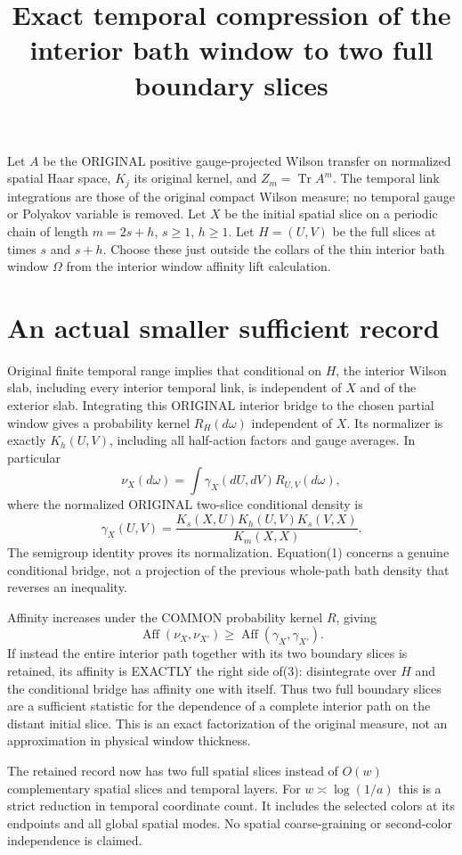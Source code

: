 \documentclass{article}
\title{Exact temporal compression of the interior bath window to two full boundary slices}\author{}\date{}
\begin{document}
\maketitle
Let $A$ be the ORIGINAL positive gauge-projected Wilson transfer on normalized spatial Haar space, $K_j$ its original kernel, and $Z_m=\operatorname{Tr}A^m$. The temporal link integrations are those of the original compact Wilson measure; no temporal gauge or Polyakov variable is removed. Let $X$ be the initial spatial slice on a periodic chain of length $m=2s+h$, $s\ge1$, $h\ge1$. Let $H=(U,V)$ be the full slices at times $s$ and $s+h$. Choose these just outside the collars of the thin interior bath window $\Omega$ from the interior window affinity lift calculation.

\section*{An actual smaller sufficient record}
Original finite temporal range implies that conditional on $H$, the interior Wilson slab, including every interior temporal link, is independent of $X$ and of the exterior slab. Integrating this ORIGINAL interior bridge to the chosen partial window gives a probability kernel $R_H(d\omega)$ independent of $X$. Its normalizer is exactly $K_h(U,V)$, including all half-action factors and gauge averages. In particular
\[
 \nu_X(d\omega)=\int\gamma_X(dU,dV)R_{U,V}(d\omega),  \tag{1}
\]
where the normalized ORIGINAL two-slice conditional density is
\[
 \gamma_X(U,V)=
 \frac{K_s(X,U)K_h(U,V)K_s(V,X)}{K_m(X,X)}.           \tag{2}
\]
The semigroup identity proves its normalization. Equation(1) concerns a genuine conditional bridge, not a projection of the previous whole-path bath density that reverses an inequality.

Affinity increases under the COMMON probability kernel $R$, giving
\[
 \operatorname{Aff}(\nu_X,\nu_{X'})
 \ge\operatorname{Aff}(\gamma_X,\gamma_{X'}).         \tag{3}
\]
If instead the entire interior path together with its two boundary slices is retained, its affinity is EXACTLY the right side of(3): disintegrate over $H$ and the conditional bridge has affinity one with itself. Thus two full boundary slices are a sufficient statistic for the dependence of a complete interior path on the distant initial slice. This is an exact factorization of the original measure, not an approximation in physical window thickness.

The retained record now has two full spatial slices instead of $O(w)$ complementary spatial slices and temporal layers. For $w\asymp\log(1/a)$ this is a strict reduction in temporal coordinate count. It includes the selected colors at its endpoints and all global spatial modes. No spatial coarse-graining or second-color independence is claimed.
\end{document}
